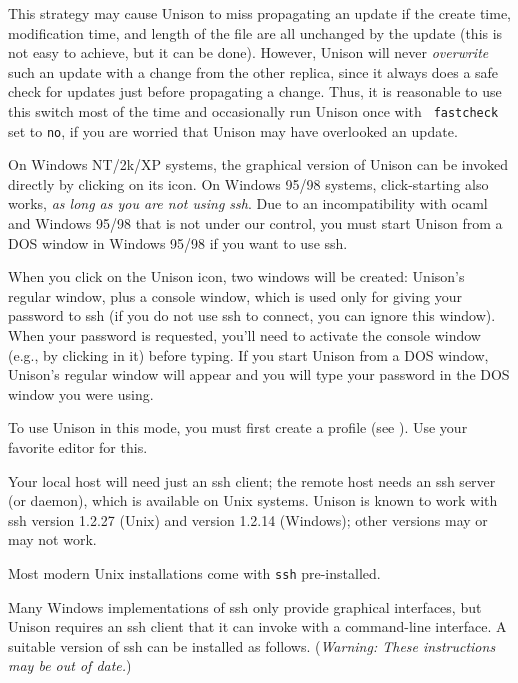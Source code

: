 \documentclass{article}
\begin{document}
This strategy may cause Unison to miss propagating an update if the
create time, modification time, and length of the file are all unchanged
by the update (this is not easy to achieve, but it can be done).
However, Unison will never {\em overwrite} such an update with a change
from the other replica, since it always does a safe check for updates
just before propagating a change.  Thus, it is reasonable to use this
switch most of the time and occasionally run Unison once with {\tt
  fastcheck} set to \verb|no|, if you are worried that Unison may have
overlooked an update.




On Windows NT/2k/XP systems, the graphical version of Unison can be
invoked directly by clicking on its icon.  On Windows 95/98 systems,
click-starting also works, {\em as long as you are not using ssh}.
Due to an incompatibility with ocaml and Windows 95/98 that is not
under our control, you must start Unison from a DOS window in Windows
95/98 if you want to use ssh.

When you click on the Unison icon, two windows will be created:
Unison's regular window, plus a console window, which is used only for
giving your password to ssh (if you do not use ssh to connect, you can
ignore this window).  When your password is requested, you'll need to
activate the console window (e.g., by clicking in it) before typing.
If you start Unison from a DOS window, Unison's regular window will
appear and you will type your password in the DOS window you were
using.

To use Unison in this mode, you must first create a profile (see
).  Use your favorite editor for this.  


\appendix
{}

Your local host will need just an ssh client; the remote host needs an
ssh server (or daemon), which is available on Unix systems.  Unison is
known to work with ssh version 1.2.27 (Unix) and version 1.2.14
(Windows); other versions may or may not work.


Most modern Unix installations come with \verb|ssh| pre-installed.

Many Windows implementations of ssh only provide graphical interfaces,
but Unison requires an ssh client that it can invoke with a
command-line interface.  A suitable version of ssh can be installed as
follows.  ({\em Warning: These instructions may be out of date.}) 
\end{document}
